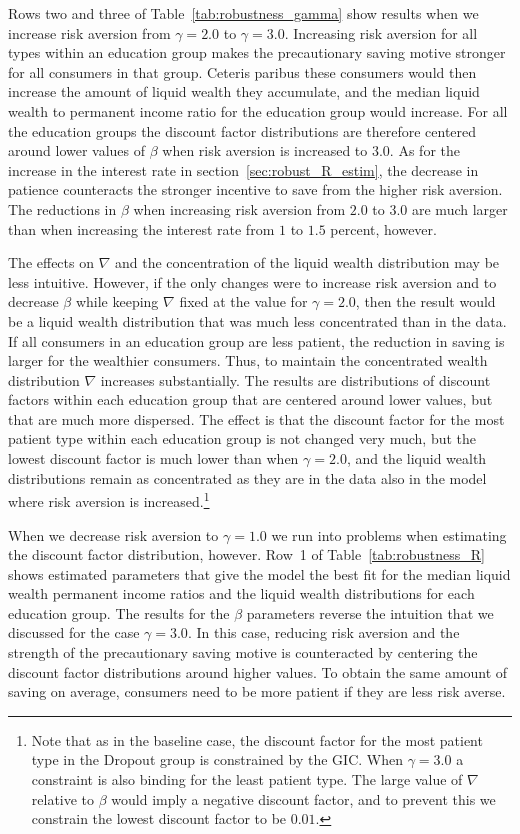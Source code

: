 \documentclass[../HAFiscal]{subfiles}
\begin{document}
Rows two and three of Table~\ref{tab:robustness_gamma} show results when we increase risk aversion from $\gamma=2.0$ to $\gamma=3.0$. Increasing risk aversion for all types within an education group makes the precautionary saving motive stronger for all consumers in that group. Ceteris paribus these consumers would then increase the amount of liquid wealth they accumulate, and the median liquid wealth to permanent income ratio for the education group would increase. For all the education groups the discount factor distributions are therefore centered around lower values of $\beta$ when risk aversion is increased to $3.0$. As for the increase in the interest rate in section~\ref{sec:robust_R_estim}, the decrease in patience counteracts the stronger incentive to save from the higher risk aversion. The reductions in $\beta$ when increasing risk aversion from $2.0$ to $3.0$ are much larger than when increasing the interest rate from $1$ to $1.5$ percent, however. 

The effects on $\nabla$ and the concentration of the liquid wealth distribution may be less intuitive. However, if the only changes were to increase risk aversion and to decrease $\beta$ while keeping $\nabla$ fixed at the value for $\gamma=2.0$, then the result would be a liquid wealth distribution that was much less concentrated than in the data. If all consumers in an education group are less patient, the reduction in saving is larger for the wealthier consumers. Thus, to maintain the concentrated wealth distribution $\nabla$ increases substantially. The results are distributions of discount factors within each education group that are centered around lower values, but that are much more dispersed. The effect is that the discount factor for the most patient type within each education group is not changed very much, but the lowest discount factor is much lower than when $\gamma=2.0$, and the liquid wealth distributions remain as concentrated as they are in the data also in the model where risk aversion is increased.\footnote{Note that as in the baseline case, the discount factor for the most patient type in the Dropout group is constrained by the GIC. When $\gamma=3.0$ a constraint is also binding for the least patient type. The large value of $\nabla$ relative to $\beta$ would imply a negative discount factor, and to prevent this we constrain the lowest discount factor to be $0.01$.}

When we decrease risk aversion to $\gamma=1.0$ we run into problems when estimating the discount factor distribution, however. Row~1 of Table~\ref{tab:robustness_R} shows estimated parameters that give the model the best fit for the median liquid wealth permanent income ratios and the liquid wealth distributions for each education group. The results for the $\beta$ parameters reverse the intuition that we discussed for the case $\gamma=3.0$. In this case, reducing risk aversion and the strength of the precautionary saving motive is counteracted by centering the discount factor distributions around higher values. To obtain the same amount of saving on average, consumers need to be more patient if they are less risk averse.  
\end{document}
